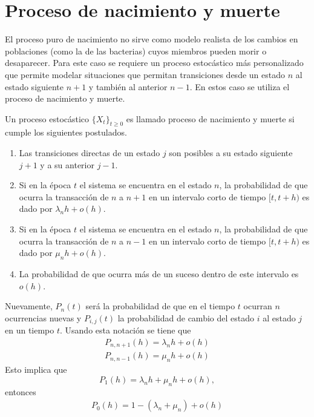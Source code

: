 \section{Proceso de nacimiento y muerte}
\label{section_procesoNacMu}
El proceso puro de nacimiento no sirve como modelo realista de los cambios en poblaciones (como la de las bacterias) cuyos miembros pueden morir o desaparecer. Para este caso se requiere un proceso estocástico más personalizado que permite modelar situaciones que permitan transiciones desde un estado $n$ al estado siguiente $n+1$ y también al  anterior $n-1$. En estos caso se utiliza el proceso de nacimiento y muerte.\\
\begin{Def}
Un proceso estocástico $\{X_t\}_{t\geq 0}$ es  llamado proceso de nacimiento y muerte si cumple los siguientes postulados. 
    \begin{enumerate}
        \item Las transiciones directas de un estado $j$ son posibles a su estado siguiente $j+1$ y a su anterior $j-1$.
        \item Si en la época $t$ el sistema se encuentra en el estado $n$, la probabilidad de que ocurra la transacción de $n$ a $n+1$ en un intervalo corto de tiempo $[t,t+h)$ es dado por $\lambda_n h+o(h)$.

        \item Si en la época $t$ el sistema se encuentra en el estado $n$, la probabilidad de que ocurra la transacción de $n$ a $n-1$ en un intervalo corto de tiempo $[t,t+h)$ es dado por $\mu_n h+o(h)$.
        \item La probabilidad de que ocurra más de un suceso dentro de este intervalo es $o(h)$.
    \end{enumerate}
\end{Def}
Nuevamente, $P_n(t)$ será la probabilidad de que en el tiempo $t$ ocurran $n$ ocurrencias nuevas y $P_{i, j}(t)$ la probabilidad de cambio del estado $i$ al estado $j$ en un tiempo $t$. Usando esta notación se tiene que 
\begin{eqnarray}
     P_{n,n+1}(h)=\lambda_n h + o(h)
    \label{procNacimientoMuerte-condicion-1}
\end{eqnarray}
\begin{eqnarray}
    P_{n,n-1}(h)=\mu_n h + o(h)
    \label{procNacimientoMuerte-condicion-2}
\end{eqnarray}
Esto implica que
$$P_1(h)=\lambda_n h +\mu_n h+ o(h),$$
entonces
\begin{eqnarray}
    P_0(h)=1-(\lambda_n+\mu_n)+o(h)
    \label{procNacimientoMuerte-condicion-3}
\end{eqnarray}
